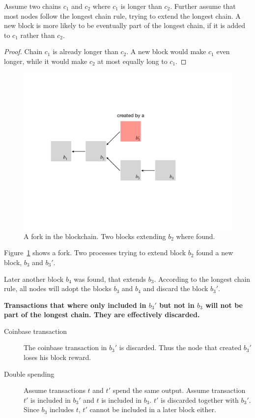 \begin{lem}
Assume two chains $c_1$ and $c_2$ where $c_1$ is longer than $c_2$. Further assume that most nodes follow the longest chain rule, trying to extend the longest chain.
	A new block is more likely to be eventually part of the longest chain, if it is added to $c_1$ rather than $c_2$.
\end{lem}
\begin{proof}
Chain $c_1$ is already longer than $c_2$. A new block would make $c_1$ even longer, while it would make $c_2$ at most equally long to $c_1$.
\end{proof}

\begin{figure}
	
	\includegraphics[width=\textwidth]{fig/fork}
	\caption{A fork in the blockchain. Two blocks extending $b_2$ where found.}
	\label{fig:fork}
\end{figure}

\begin{example}
	Figure~\ref{fig:fork} shows a fork. Two processes trying to extend block $b_2$ found a new block, $b_3$ and $b_3'$.
	
	Later another block $b_4$ was found, that extends $b_3$.
	According to the longest chain rule, all nodes will adopt the blocks $b_3$ and $b_4$ and discard the block $b_3'$.
	
	\textbf{Transactions that where only included in $b_3'$ but not in $b_3$ will not be part of the longest chain. They are effectively discarded.}
	\begin{description}
		\item[Coinbase transaction] The coinbase transaction in $b_3'$ is discarded. Thus the node that created $b_3'$ loses his block reward.
		\item[Double spending] Assume transactions $t$ and $t'$ spend the same output. Assume transaction $t'$ is included in $b_3'$ and $t$ is included in $b_3$. $t'$ is discarded together with $b_3'$. Since $b_3$ includes $t$, $t'$ cannot be included in a later block either.
	\end{description}
	
	 
\end{example}

